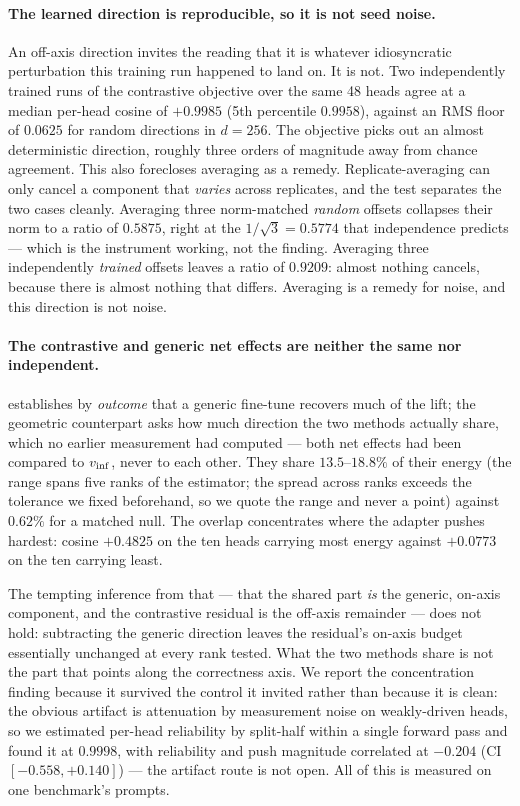 \paragraph{The learned direction is reproducible, so it is not seed noise.}
An off-axis direction invites the reading that it is whatever idiosyncratic
perturbation this training run happened to land on. It is not. Two independently
trained runs of the contrastive objective over the same 48 heads agree at a median
per-head cosine of $\mathbf{+0.9985}$ (5th percentile $0.9958$), against an RMS floor
of $0.0625$ for random directions in $d{=}256$. The objective picks out an almost
deterministic direction, roughly three orders of magnitude away from chance
agreement. This also forecloses averaging as a remedy. Replicate-averaging can only
cancel a component that \emph{varies} across replicates, and the test separates the
two cases cleanly. Averaging three norm-matched \emph{random} offsets collapses their
norm to a ratio of $\mathbf{0.5875}$, right at the $1/\sqrt{3} = 0.5774$ that
independence predicts --- which is the instrument working, not the finding. Averaging
three independently \emph{trained} offsets leaves a ratio of $\mathbf{0.9209}$: almost
nothing cancels, because there is almost nothing that differs. Averaging is a remedy
for noise, and this direction is not noise.

\paragraph{The contrastive and generic net effects are neither the same nor
independent.}  establishes by \emph{outcome} that a generic
fine-tune recovers much of the lift; the geometric counterpart asks how much
direction the two methods actually share, which no earlier measurement had
computed --- both net effects had been compared to $v_{\mathrm{inf}}$, never to each other.
They share $\mathbf{13.5}$--$\mathbf{18.8\%}$ of their energy (the range spans five
ranks of the estimator; the spread across ranks exceeds the tolerance we fixed
beforehand, so we quote the range and never a point) against $0.62\%$ for a matched
null. The overlap concentrates where the adapter pushes hardest: cosine $+0.4825$ on
the ten heads carrying most energy against $+0.0773$ on the ten carrying least.

The tempting inference from that --- that the shared part \emph{is} the generic,
on-axis component, and the contrastive residual is the off-axis remainder --- does
not hold: subtracting the generic direction leaves the residual's on-axis budget
essentially unchanged at every rank tested. What the two methods share is not the
part that points along the correctness axis. We report the concentration finding
because it survived the control it invited rather than because it is clean: the
obvious artifact is attenuation by measurement noise on weakly-driven heads, so we
estimated per-head reliability by split-half within a single forward pass and found
it at $0.9998$, with reliability and push magnitude correlated at $-0.204$ (CI
$[-0.558, +0.140]$) --- the artifact route is not open. All of this is measured on
one benchmark's prompts.

